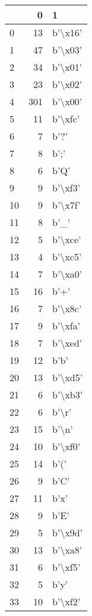 \begin{tabular}{lrl}
\toprule
{} &    0 &        1 \\
\midrule
0   &   13 &  b'\textbackslash x16' \\
1   &   47 &  b'\textbackslash x03' \\
2   &   34 &  b'\textbackslash x01' \\
3   &   23 &  b'\textbackslash x02' \\
4   &  301 &  b'\textbackslash x00' \\
5   &   11 &  b'\textbackslash xfc' \\
6   &    7 &     b'?' \\
7   &    8 &     b';' \\
8   &    6 &     b'Q' \\
9   &    9 &  b'\textbackslash xf3' \\
10  &    9 &  b'\textbackslash x7f' \\
11  &    8 &     b'\_' \\
12  &    5 &  b'\textbackslash xce' \\
13  &    4 &  b'\textbackslash xc5' \\
14  &    7 &  b'\textbackslash xa0' \\
15  &   16 &     b'+' \\
16  &    7 &  b'\textbackslash x8c' \\
17  &    9 &  b'\textbackslash xfa' \\
18  &    7 &  b'\textbackslash xed' \\
19  &   12 &     b'b' \\
20  &   13 &  b'\textbackslash xd5' \\
21  &    6 &  b'\textbackslash xb3' \\
22  &    6 &    b'\textbackslash r' \\
23  &   15 &    b'\textbackslash n' \\
24  &   10 &  b'\textbackslash xf0' \\
25  &   14 &     b'(' \\
26  &    9 &     b'C' \\
27  &   11 &     b'x' \\
28  &    9 &     b'E' \\
29  &    5 &  b'\textbackslash x9d' \\
30  &   13 &  b'\textbackslash xa8' \\
31  &    6 &  b'\textbackslash xf5' \\
32  &    5 &     b'y' \\
33  &   10 &  b'\textbackslash xf2' \\

\end{tabular}

